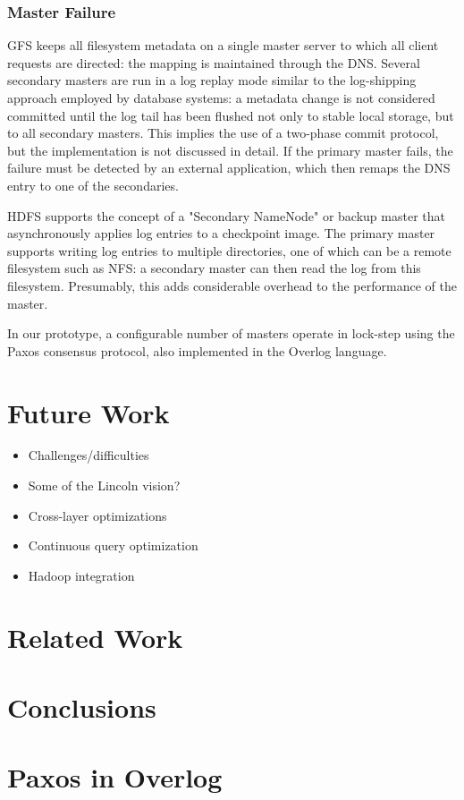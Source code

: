 \documentclass{article}
\begin{document}
\subsubsection{Master Failure}
 GFS keeps all filesystem metadata on a single master server to which all client requests are directed: the mapping is maintained through the DNS.  Several secondary masters are run in a log replay mode similar to the log-shipping approach employed by database systems: a metadata change is not considered committed until the log tail has been flushed not only to stable local storage, but to all secondary masters.  This implies the use of a two-phase commit protocol, but the implementation is not discussed in detail.  If the primary master fails, the failure must be detected by an external application, which then remaps the DNS entry to one of the secondaries.
 
 HDFS supports the concept of a "Secondary NameNode" or backup master that asynchronously applies  log entries to a checkpoint image.  The primary master supports writing log entries to multiple directories, one of which can be a remote filesystem such as NFS: a secondary master can then read the log from this filesystem.  Presumably, this adds considerable overhead to the performance of the master.
 
 In our prototype, a configurable number of masters operate in lock-step using the Paxos consensus protocol, also implemented in the Overlog language.  
 

\section{Future Work}
\begin{itemize}
\item
  Challenges/difficulties

\item
  Some of the Lincoln vision?

\item
  Cross-layer optimizations

\item
  Continuous query optimization

\item
  Hadoop integration
\end{itemize}

\section{Related Work}

\section{Conclusions}



\appendix
\section{Paxos in Overlog}
\end{document}
